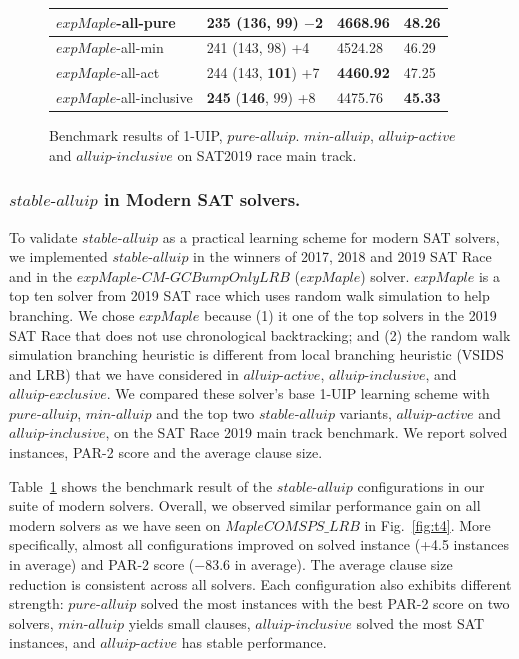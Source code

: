 \documentclass[runningheads]{llncs}
\newcommand{\oneuip}{1-UIP\xspace}
\newcommand{\stablealluip}{\textit{stable-alluip}\xspace}
\newcommand{\allUipPure}{\textit{pure-alluip}\xspace}
\newcommand{\allUipMin}{\textit{min-alluip}\xspace}
\newcommand{\allUipAct}{\textit{alluip-active}}
\newcommand{\allUipIn}{\textit{alluip-inclusive}}
\newcommand{\allUipEx}{\textit{alluip-exclusive}}
\newcommand{\MapleBase}{\textit{MapleCOMSPS\_LRB}}
\newcommand{\expSAT}{\textit{expMaple-CM-GCBumpOnlyLRB} }
\newcommand{\expSATShort}{\textit{expMaple} }
\begin{document}
\begin{figure}
\begin{center}
\begin{tabular}{|l|l|l|l|}
\hline
$\expSATShort$-all-pure & 235 (136, 99) $-$2  & 4668.96 & 48.26 \\
\hline
$\expSATShort$-all-min & 241 (143, 98) +4 & 4524.28 & 46.29 \\ 
\hline
$\expSATShort$-all-act & 244 (143, \textbf{101}) +7 & \textbf{4460.92} & 47.25 \\
\hline
$\expSATShort$-all-inclusive & \textbf{245} (\textbf{146}, 99) +8 & 4475.76 & \textbf{45.33} \\
\hline
\end{tabular}
\end{center}
\caption{Benchmark results of \oneuip, $\allUipPure$. $\allUipMin$, $\allUipAct$ and $\allUipIn$ on SAT2019 race main track.}
\label{fig:t5}
\end{figure}


\subsubsection{$\stablealluip$ in Modern SAT solvers.}
\begin{sloppypar}
To validate $\stablealluip$ as a practical learning scheme for modern
SAT solvers, we implemented $\stablealluip$ in the winners of 2017,
2018 and 2019 SAT Race
\cite{DBLP:conf/ijcai/LuoLXML17,ryvchin2018maple,Stepan2019MapleLCMDistChronoBT}
and in the $\expSAT$ \cite{MdSolimul2019expMalpe} ($\expSATShort$)
solver. $\expSATShort$ is a top ten solver from 2019 SAT race which
uses random walk simulation to help branching. We chose $\expSATShort$
because (1) it one of the top solvers in the 2019 SAT Race that does
not use chronological backtracking; and (2) the random walk simulation
branching heuristic is different from local branching heuristic (VSIDS
and LRB) that we have considered in $\allUipAct$, $\allUipIn$, and
$\allUipEx$. We compared these solver's base \oneuip learning scheme
with $\allUipPure$, $\allUipMin$ and the top two $\stablealluip$
variants, $\allUipAct$ and $\allUipIn$, on the SAT Race 2019 main
track benchmark. We report solved instances, PAR-2 score and the
average clause size.
\end{sloppypar}

Table~\ref{fig:t5} shows the benchmark result of the $\stablealluip$
configurations in our suite of modern solvers. Overall, we observed
similar performance gain on all modern solvers as we have seen on
$\MapleBase$ in Fig.~\ref{fig:t4}. More specifically, almost all
configurations improved on solved instance (+4.5 instances in average)
and PAR-2 score ($-$83.6 in average).  The average clause size
reduction is consistent across all solvers. Each configuration also
exhibits different strength: $\allUipPure$ solved the most instances
with the best PAR-2 score on two solvers, $\allUipMin$ yields small
clauses, $\allUipIn$ solved the most SAT instances, and $\allUipAct$
has stable performance.
\end{document}
